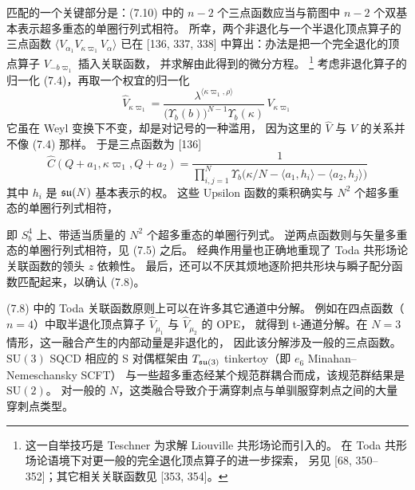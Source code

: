 匹配的一个关键部分是：(7.10) 中的 $n-2$ 个三点函数应当与箭图中
$n-2$ 个双基本表示超多重态的单圈行列式相符。
所幸，两个非退化与一个半退化顶点算子的三点函数 $\langle V_{\alpha_1}V_{\kappa\varpi_1}V_\alpha\rangle$
已在 [136, 337, 338] 中算出：办法是把一个完全退化的顶点算子 $V_{-b\varpi_1}$ 插入关联函数，
并求解由此得到的微分方程。
\footnote{这一自举技巧是 Teschner 为求解 Liouville 共形场论而引入的。
在 Toda 共形场论语境下对更一般的完全退化顶点算子的进一步探索，
另见 [68, 350--352]；其它相关关联函数见 [353, 354]。}
考虑非退化算子的归一化 (7.4)，再取一个权宜的归一化
\begin{equation}
\widehat{V}_{\kappa\varpi_1}
=\frac{\lambda^{\langle\kappa\varpi_1,\rho\rangle}}
{\big(\Upsilon_b(b)\big)^{N-1}\Upsilon_b(\kappa)}\,V_{\kappa\varpi_1}
\tag{7.11}
\end{equation}
它虽在 Weyl 变换下不变，却是对记号的一种滥用，
因为这里的 $\widehat{V}$ 与 $V$ 的关系并不像 (7.4) 那样。
于是三点函数为 [136]
\begin{equation}
\widehat{C}(Q+a_1,\kappa\varpi_1,Q+a_2)
=\frac{1}{\prod_{i,j=1}^{N}\Upsilon_b\big(\kappa/N-\langle a_1,h_i\rangle-\langle a_2,h_j\rangle\big)}
\tag{7.12}
\end{equation}
其中 $h_i$ 是 $\mathfrak{su}(N)$ 基本表示的权。
这些 Upsilon 函数的乘积确实与 $N^2$ 个超多重态的单圈行列式相符，


即 $S^4_b$ 上、带适当质量的 $N^2$ 个超多重态的单圈行列式。
逆两点函数则与矢量多重态的单圈行列式相符，见 (7.5) 之后。
经典作用量也正确地重现了 Toda 共形场论关联函数的领头 $z$ 依赖性。
最后，还可以不厌其烦地逐阶把共形块与瞬子配分函数匹配起来，以确认 (7.8)。

(7.8) 中的 Toda 关联函数原则上可以在许多其它通道中分解。
例如在四点函数（$n=4$）中取半退化顶点算子 $\widehat{V}_{\mu_1}$ 与 $\widehat{V}_{\mu_2}$ 的 OPE，
就得到 t-通道分解。在 $N=3$ 情形，这一融合产生的内部动量是非退化的，
因此该分解涉及一般的三点函数。
$\mathrm{SU}(3)$ SQCD 相应的 S 对偶框架由 $T_{\mathfrak{su}(3)}$ tinkertoy（即 $e_6$ Minahan--Nemeschansky SCFT）
与一些超多重态经某个规范群耦合而成，该规范群结果是 $\mathrm{SU}(2)$。
对一般的 $N$，这类融合导致介于满穿刺点与单驯服穿刺点之间的大量穿刺点类型。

